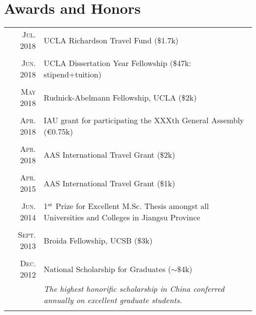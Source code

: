 \documentclass[letterpaper,12pt]{article}
\newcommand{\narrow}{-1.6ex}
\newcommand{\textwrap}{5.3in}
\begin{document}
\section{Awards and Honors}

\vspace*{-.5em}
\begin{longtable}{r|p{\textwrap}}
    \textsc{Jul. 2018} & UCLA Richardson Travel Fund (\$1.7k)   \\
    \multicolumn{2}{c}{} \\[\narrow]
    \textsc{Jun. 2018} & UCLA Dissertation Year Fellowship (\$47k: stipend+tuition)    \\
    \multicolumn{2}{c}{} \\[\narrow]
    \textsc{May 2018} & Rudnick-Abelmann Fellowship, UCLA (\$2k)      \\
    \multicolumn{2}{c}{} \\[\narrow]
    \textsc{Apr. 2018} & IAU grant for participating the XXXth General Assembly (\euro0.75k)  \\
    \multicolumn{2}{c}{} \\[\narrow]
    \textsc{Apr. 2018} & AAS International Travel Grant (\$2k)    \\
    \multicolumn{2}{c}{} \\[\narrow]
    \textsc{Apr. 2015} & AAS International Travel Grant (\$1k)    \\
    \multicolumn{2}{c}{} \\[\narrow]
    \textsc{Jun. 2014} & 1$^{\rm st}$ Prize for Excellent M.Sc. Thesis amongst all Universities and Colleges in Jiangsu Province   \\
    \multicolumn{2}{c}{} \\[\narrow]
    \textsc{Sept. 2013} & Broida Fellowship, UCSB (\$3k)  \\
    \multicolumn{2}{c}{} \\[\narrow]
    \textsc{Dec. 2012} & National Scholarship for Graduates ($\sim$\$4k)  \\
                     & {\it The highest honorific scholarship in China conferred annually on excellent graduate students.}\\
    \multicolumn{2}{c}{} \\[\narrow]

\end{longtable}
\end{document}
